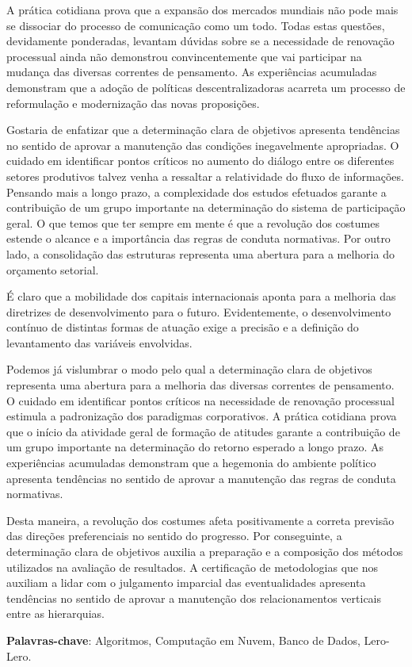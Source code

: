 \setlength{\absparsep}{18pt} %
\begin{resumo}
 
A prática cotidiana prova que a expansão dos mercados mundiais não pode mais se dissociar do processo de comunicação como um todo. Todas estas questões, devidamente ponderadas, levantam dúvidas sobre se a necessidade de renovação processual ainda não demonstrou convincentemente que vai participar na mudança das diversas correntes de pensamento. As experiências acumuladas demonstram que a adoção de políticas descentralizadoras acarreta um processo de reformulação e modernização das novas proposições. 

Gostaria de enfatizar que a determinação clara de objetivos apresenta tendências no sentido de aprovar a manutenção das condições inegavelmente apropriadas. O cuidado em identificar pontos críticos no aumento do diálogo entre os diferentes setores produtivos talvez venha a ressaltar a relatividade do fluxo de informações. Pensando mais a longo prazo, a complexidade dos estudos efetuados garante a contribuição de um grupo importante na determinação do sistema de participação geral. O que temos que ter sempre em mente é que a revolução dos costumes estende o alcance e a importância das regras de conduta normativas. Por outro lado, a consolidação das estruturas representa uma abertura para a melhoria do orçamento setorial. 

É claro que a mobilidade dos capitais internacionais aponta para a melhoria das diretrizes de desenvolvimento para o futuro. Evidentemente, o desenvolvimento contínuo de distintas formas de atuação exige a precisão e a definição do levantamento das variáveis envolvidas.

Podemos já vislumbrar o modo pelo qual a determinação clara de objetivos representa uma abertura para a melhoria das diversas correntes de pensamento. O cuidado em identificar pontos críticos na necessidade de renovação processual estimula a padronização dos paradigmas corporativos. A prática cotidiana prova que o início da atividade geral de formação de atitudes garante a contribuição de um grupo importante na determinação do retorno esperado a longo prazo. As experiências acumuladas demonstram que a hegemonia do ambiente político apresenta tendências no sentido de aprovar a manutenção das regras de conduta normativas. 

Desta maneira, a revolução dos costumes afeta positivamente a correta previsão das direções preferenciais no sentido do progresso. Por conseguinte, a determinação clara de objetivos auxilia a preparação e a composição dos métodos utilizados na avaliação de resultados. A certificação de metodologias que nos auxiliam a lidar com o julgamento imparcial das eventualidades apresenta tendências no sentido de aprovar a manutenção dos relacionamentos verticais entre as hierarquias. 

 \textbf{Palavras-chave}: Algoritmos, Computação em Nuvem, Banco de Dados, Lero-Lero.
\end{resumo}